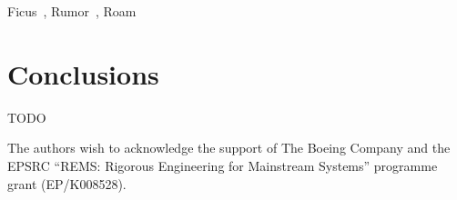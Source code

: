 \documentclass[sigconf]{acmart}
\begin{document}
Ficus~\cite{Reiher:1994wh}, Rumor~\cite{Guy:1999gy}, Roam~\cite{Ratner:1999fh}

\section{Conclusions}

TODO


\begin{acks}
The authors wish to acknowledge the support of The Boeing Company and the EPSRC ``REMS: Rigorous Engineering for Mainstream Systems'' programme grant (EP/K008528).
\end{acks}


{}
\end{document}
